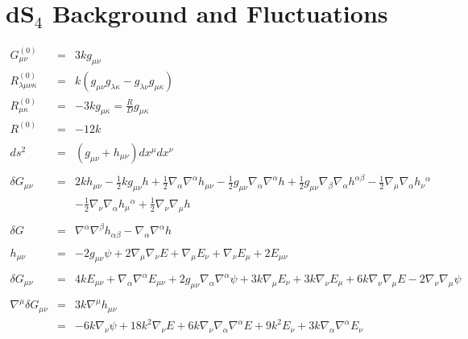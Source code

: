 \documentclass[10pt,letterpaper]{article}
\numberwithin{equation}{section}
\begin{document}
\section{dS$_4$ Background and Fluctuations}
\begin{eqnarray}
G^{(0)}_{\mu\nu} &=& 3kg_{\mu\nu}
\nonumber\\
R^{(0)}_{\lambda\mu\nu\kappa} &=& k(g_{\mu\nu}g_{\lambda\kappa}-g_{\lambda\nu}g_{\mu\kappa})
\nonumber\\
R^{(0)}_{\mu\kappa} &=& -3k g_{\mu\kappa} = \frac{R}{D}g_{\mu\kappa}
\nonumber\\
R^{(0)}&=& -12 k
\nonumber\\ \nonumber\\
ds^2 &=& (g_{\mu\nu} + h_{\mu\nu})dx^\mu dx^\nu
\nonumber\\ \nonumber\\
\delta G_{\mu\nu}&=& 2 k h_{\mu \nu}
-  \tfrac{1}{2} k g_{\mu \nu} h
+ \tfrac{1}{2} \nabla_{\alpha}\nabla^{\alpha}h_{\mu \nu}
-  \tfrac{1}{2} g_{\mu \nu} \nabla_{\alpha}\nabla^{\alpha}h
+ \tfrac{1}{2} g_{\mu \nu} \nabla_{\beta}\nabla_{\alpha}h^{\alpha \beta}
-  \tfrac{1}{2} \nabla_{\mu}\nabla_{\alpha}h_{\nu}{}^{\alpha}\nonumber\\
&& -  \tfrac{1}{2} \nabla_{\nu}\nabla_{\alpha}h_{\mu}{}^{\alpha}
+ \tfrac{1}{2} \nabla_{\nu}\nabla_{\mu}h
\nonumber\\ \nonumber\\
\delta G &=&  \nabla^\alpha \nabla^\beta h_{\alpha\beta} - \nabla_\alpha\nabla^\alpha h
\nonumber\\ \nonumber\\
h_{\mu\nu} &=& -2g_{\mu\nu}\psi +2\nabla_\mu\nabla_\nu E + \nabla_\mu E_\nu + \nabla_\nu E_\mu + 2E_{\mu\nu}
\nonumber\\ \nonumber\\
\delta G_{\mu\nu} &=& 4 k E_{\mu \nu} + \nabla_{\alpha}\nabla^{\alpha}E_{\mu \nu} + 2 g_{\mu \nu} \nabla_{\alpha}\nabla^{\alpha}\psi + 3 k \nabla_{\mu}E_{\nu} + 3 k \nabla_{\nu}E_{\mu} + 6 k \nabla_{\nu}\nabla_{\mu}E - 2 \nabla_{\nu}\nabla_{\mu}\psi
\nonumber\\ \nonumber\\
\nabla^\mu \delta G_{\mu\nu} &=& 3k\nabla^\mu h_{\mu\nu} 
\nonumber\\
&=&  - 6 k \nabla_{\nu}\psi+ 18 k^2 \nabla_{\nu}E + 6 k \nabla_{\nu}\nabla_{\alpha}\nabla^{\alpha}E+ 9 k^2 E_{\nu} + 3 k \nabla_{\alpha}\nabla^{\alpha}E_{\nu}
\nonumber\\ \nonumber\\

\end{eqnarray}
\end{document}
